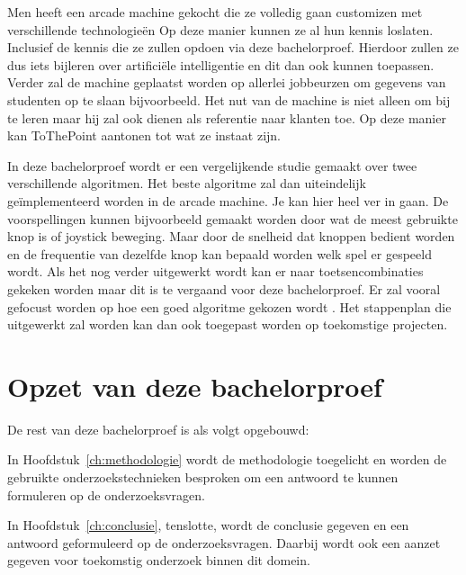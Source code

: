 Men heeft een arcade machine gekocht die ze volledig gaan customizen met verschillende technologieën Op deze manier kunnen ze al hun kennis loslaten. Inclusief de kennis die ze zullen opdoen via deze bachelorproef. Hierdoor zullen ze dus iets bijleren over artificiële intelligentie en dit dan ook kunnen toepassen. Verder zal de machine geplaatst worden op allerlei jobbeurzen om gegevens van studenten op te slaan bijvoorbeeld. Het nut van de machine is niet alleen om bij te leren maar hij zal ook dienen als referentie naar klanten toe. Op deze manier kan ToThePoint aantonen tot wat ze instaat zijn. 

In deze bachelorproef wordt er een vergelijkende studie gemaakt over twee verschillende algoritmen. Het beste algoritme zal dan uiteindelijk geïmplementeerd worden in de arcade machine. Je kan hier heel ver in gaan. De voorspellingen kunnen bijvoorbeeld gemaakt worden door wat de meest gebruikte knop is of joystick beweging. Maar door de snelheid dat knoppen bedient worden en de frequentie van dezelfde knop kan bepaald worden welk spel er gespeeld wordt. Als het nog verder uitgewerkt wordt kan er naar toetsencombinaties gekeken worden maar dit is te vergaand voor deze bachelorproef. Er zal vooral gefocust worden op hoe een goed algoritme gekozen wordt . Het stappenplan die uitgewerkt zal worden kan dan ook toegepast worden op toekomstige projecten.



\section{Opzet van deze bachelorproef}
\label{sec:opzet-bachelorproef}


De rest van deze bachelorproef is als volgt opgebouwd:

In Hoofdstuk~\ref{ch:methodologie} wordt de methodologie toegelicht en worden de gebruikte onderzoekstechnieken besproken om een antwoord te kunnen formuleren op de onderzoeksvragen.


In Hoofdstuk~\ref{ch:conclusie}, tenslotte, wordt de conclusie gegeven en een antwoord geformuleerd op de onderzoeksvragen. Daarbij wordt ook een aanzet gegeven voor toekomstig onderzoek binnen dit domein.


